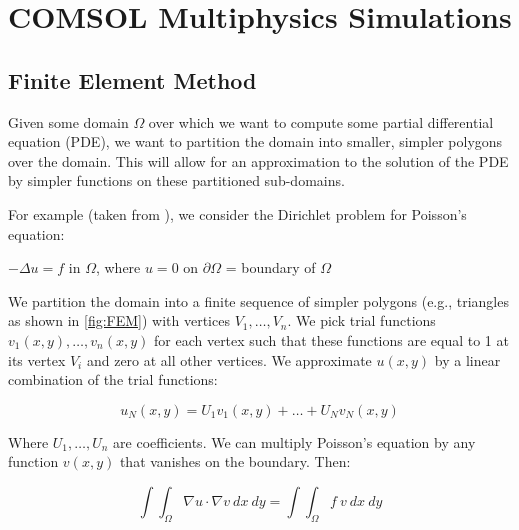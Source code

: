 \documentclass[%
 reprint,
nofootinbib,
 amsmath,amssymb,
 aps,
]{revtex4-2}
\begin{document}


\appendix

\section{COMSOL Multiphysics Simulations}


\subsection{Finite Element Method}\label{FEM_method_Strauss}
Given some domain $\Omega$ over which we want to compute some partial differential equation (PDE), we want to partition the domain into smaller, simpler polygons over the domain. This will allow for an approximation to the solution of the PDE by simpler functions on these partitioned sub-domains.
\newline

For example (taken from \cite{Strauss_PDES}), we consider the Dirichlet problem for Poisson's equation:

\begin{center}
$ -\Delta u = f $ in $\Omega$, where $u = 0$ on $\partial \Omega$ =  boundary of $\Omega$ 
\newline
\end{center}

We partition the domain into a finite sequence of simpler polygons (e.g., triangles as shown in \ref{fig:FEM}) with vertices $V_1, \dots ,V_n$. We pick trial functions $v_1(x,y), \dots , v_n(x,y)$ for each vertex such that these functions are equal to 1 at its vertex $V_i$ and zero at all other vertices. We approximate $u(x,y)$ by a linear combination of the trial functions:

\begin{equation}\label{eq:FEM1}
     u_N(x,y) = U_1 v_1(x,y) + \dots + U_N v_N(x,y)
\end{equation}


Where $U_1, \dots , U_n$ are coefficients. We can multiply Poisson's equation by any function $v(x,y)$ that vanishes on the boundary. Then:

\begin{equation}\label{eq:v_xy}
 \int\int_{\Omega} \nabla u \cdot \nabla v \ dx  \ dy = \int \int_{\Omega} f \ v  \ dx  \ dy 
\end{equation}
\end{document}
